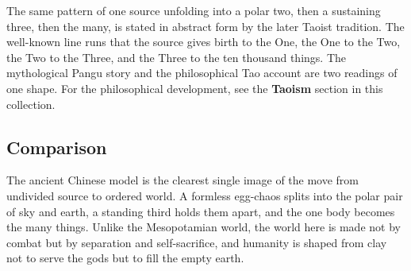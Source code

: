 The same pattern of one source unfolding into a polar two, then a sustaining three, then the many, is stated in abstract form by the later Taoist tradition. The well-known line runs that the source gives birth to the One, the One to the Two, the Two to the Three, and the Three to the ten thousand things. The mythological Pangu story and the philosophical Tao account are two readings of one shape. For the philosophical development, see the \textbf{Taoism} section in this collection.

\subsection{Comparison}

The ancient Chinese model is the clearest single image of the move from undivided source to ordered world. A formless egg-chaos splits into the polar pair of sky and earth, a standing third holds them apart, and the one body becomes the many things. Unlike the Mesopotamian world, the world here is made not by combat but by separation and self-sacrifice, and humanity is shaped from clay not to serve the gods but to fill the empty earth.
